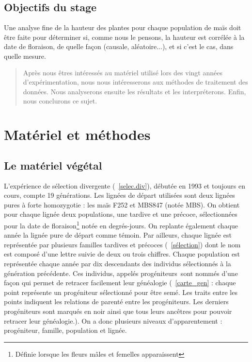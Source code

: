 \documentclass[12pt,a4paper]{article}
\begin{document}
				\subsection{Objectifs du stage}
				
					Une analyse fine de la  hauteur des plantes pour chaque population de maïs doit être faite pour déterminer si, comme nous le pensons, la hauteur est corrélée à la date de floraison, de quelle façon (causale, aléatoire...), et si c'est le cas, dans quelle mesure.
					
			\begin{quotation}
				Après nous êtres intéressés au matériel utilisé lors des vingt années d'expérimentation, nous nous intéresserons aux méthodes de traitement des données. Nous analyserons ensuite les résultats et les interpréterons. Enfin, nous conclurons ce sujet.
			\end{quotation}
			
			
			 \section{Matériel et méthodes}
			 		
			 		\subsection{Le matériel végétal}
			 			
			 			L'expérience de sélection divergente (~\ref{selec.div}), débutée en 1993 et toujours en cours, compte 19 générations. Les lignées de départ utilisées sont deux lignées pures à forte homozygotie : les maïs F252 et MBS847 (notée MBS). On obtient pour chaque lignée deux populations, une tardive et une précoce, sélectionnées pour la date de floraison\footnote{Définie lorsque les fleurs mâles et femelles apparaissent} notée en degrés-jours. On replante également chaque année la lignée pure de départ comme témoin.
			 			Par ailleurs, chaque lignée est représentée par plusieurs familles tardives et précoces (~\ref{sélection}) dont le nom est composé d'une lettre suivie de deux ou trois chiffres. Chaque population est représentée chaque année par dix descendants des individus sélectionnés à la génération précédente. Ces individus, appelés \og progéniteurs\fg~sont nommés d'une façon qui permet de retracer facilement leur généalogie (~\ref{carte_gen} : chaque point représente un progéniteur sélectionné pour être semé. Les traits entre les points indiquent les relations de parenté entre les progéniteurs. Les derniers progéniteurs sont marqués en noir ainsi que tous leurs ancêtres pour pouvoir retracer leur généalogie.). On a donc plusieurs niveaux d'apparentement : progéniteur, famille, population et lignée.
			 			
\end{document}
